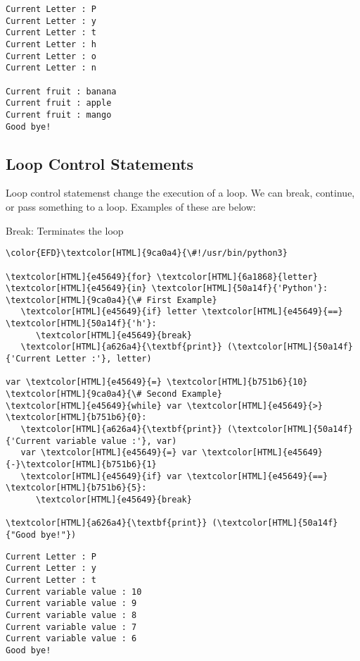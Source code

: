 \documentclass{scrartcl}
\begin{document}
\begin{Code}[alt]
\begin{verbatim}
Current Letter : P
Current Letter : y
Current Letter : t
Current Letter : h
Current Letter : o
Current Letter : n

Current fruit : banana
Current fruit : apple
Current fruit : mango
Good bye!
\end{verbatim}
\end{Code}

\subsection{Loop Control Statements}
\label{sec:org1816013}
Loop control statemenst change the execution of a loop. We can break, continue,
or pass something to a loop. Examples of these are below:

Break: Terminates the loop
\begin{Code}
\begin{Verbatim}[]
\color{EFD}\textcolor[HTML]{9ca0a4}{\#!/usr/bin/python3}

\textcolor[HTML]{e45649}{for} \textcolor[HTML]{6a1868}{letter} \textcolor[HTML]{e45649}{in} \textcolor[HTML]{50a14f}{'Python'}:     \textcolor[HTML]{9ca0a4}{\# First Example}
   \textcolor[HTML]{e45649}{if} letter \textcolor[HTML]{e45649}{==} \textcolor[HTML]{50a14f}{'h'}:
      \textcolor[HTML]{e45649}{break}
   \textcolor[HTML]{a626a4}{\textbf{print}} (\textcolor[HTML]{50a14f}{'Current Letter :'}, letter)

var \textcolor[HTML]{e45649}{=} \textcolor[HTML]{b751b6}{10}                    \textcolor[HTML]{9ca0a4}{\# Second Example}
\textcolor[HTML]{e45649}{while} var \textcolor[HTML]{e45649}{>} \textcolor[HTML]{b751b6}{0}:
   \textcolor[HTML]{a626a4}{\textbf{print}} (\textcolor[HTML]{50a14f}{'Current variable value :'}, var)
   var \textcolor[HTML]{e45649}{=} var \textcolor[HTML]{e45649}{-}\textcolor[HTML]{b751b6}{1}
   \textcolor[HTML]{e45649}{if} var \textcolor[HTML]{e45649}{==} \textcolor[HTML]{b751b6}{5}:
      \textcolor[HTML]{e45649}{break}

\textcolor[HTML]{a626a4}{\textbf{print}} (\textcolor[HTML]{50a14f}{"Good bye!"})
\end{Verbatim}
\end{Code}

\begin{verbatim}
Current Letter : P
Current Letter : y
Current Letter : t
Current variable value : 10
Current variable value : 9
Current variable value : 8
Current variable value : 7
Current variable value : 6
Good bye!
\end{verbatim}
\end{document}
